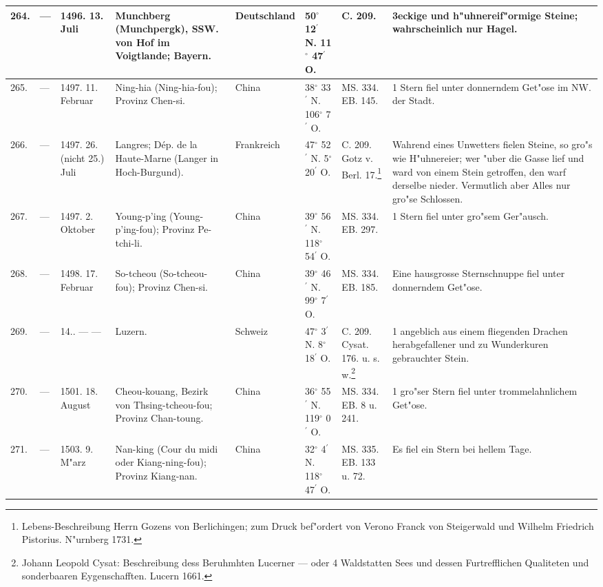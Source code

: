 \documentclass[a4paper, 8pt, oneside, polutonikogreek, german]{article}
\begin{document}
\begin{center}
\begin{longtable}{| p{4mm} | p{2mm} | p{15mm} | p{25mm} | p{16mm} | p{12mm} | p{13mm} | p{20mm} |}
        264. & --- & 1496. 13. Juli & Munchberg (Munchpergk), SSW. von Hof im Voigtlande; Bayern. & Deutschland & 50$^\circ$ 12$^\prime$ N. 11$^\circ$ 47$^\prime$ O. & C. 209. & 3eckige und h"uhnereif"ormige Steine; wahrscheinlich nur Hagel. \\ \hline
        265. & --- & 1497. 11. Februar & Ning-hia (Ning-hia-fou); Provinz Chen-si. & China & 38$^\circ$ 33$^\prime$ N. 106$^\circ$ 7$^\prime$ O. & MS. 334. EB. 145. & 1 Stern fiel unter donnerndem Get"ose im NW. der Stadt. \\ \hline
        266. & --- & 1497. 26. (nicht 25.) Juli & Langres; Dép. de la Haute-Marne (Langer in Hoch-Burgund). & Frankreich & 47$^\circ$ 52$^\prime$ N. 5$^\circ$ 20$^\prime$ O. & C. 209. Gotz v. Berl. 17.\footnote{Lebens-Beschreibung Herrn Gozens von Berlichingen; zum Druck bef"ordert von Verono Franck von Steigerwald und Wilhelm Friedrich Pistorius. N"urnberg 1731.} & Wahrend eines Unwetters fielen Steine, so gro"s wie H"uhnereier; wer "uber die Gasse lief und ward von einem Stein getroffen, den warf derselbe nieder. Vermutlich aber Alles nur gro"se Schlossen. \\ \hline
        267. & --- & 1497. 2. Oktober & Young-p’ing (Young-p’ing-fou); Provinz Pe-tchi-li. & China & 39$^\circ$ 56$^\prime$ N. 118$^\circ$ 54$^\prime$ O. & MS. 334. EB. 297. & 1 Stern fiel unter gro"sem Ger"ausch. \\ \hline
        268. & --- & 1498. 17. Februar & So-tcheou (So-tcheou-fou); Provinz Chen-si. & China & 39$^\circ$ 46$^\prime$ N. 99$^\circ$ 7$^\prime$ O. & MS. 334. EB. 185. & Eine hausgrosse Sternschnuppe fiel unter donnerndem Get"ose. \\ \hline
        269. & --- & 14.. --- --- & Luzern. & Schweiz & 47$^\circ$ 3$^\prime$ N. 8$^\circ$ 18$^\prime$ O. & C. 209. Cysat. 176. u. s. w.\footnote{Johann Leopold Cysat: Beschreibung dess Beruhmhten Lucerner --- oder 4 Waldstatten Sees und dessen Furtrefflichen Qualiteten und sonderbaaren Eygenschafften. Lucern 1661.
} & 1 angeblich aus einem fliegenden Drachen herabgefallener und zu Wunderkuren gebrauchter Stein. \\ \hline
        270. & --- & 1501. 18. August & Cheou-kouang, Bezirk von Thsing-tcheou-fou; Provinz Chan-toung. & China & 36$^\circ$ 55$^\prime$ N. 119$^\circ$ 0$^\prime$ O. & MS. 334. EB. 8 u. 241. & 1 gro"ser Stern fiel unter trommelahnlichem Get"ose. \\ \hline
        271. & --- & 1503. 9. M"arz & Nan-king (Cour du midi oder Kiang-ning-fou); Provinz Kiang-nan. & China & 32$^\circ$ 4$^\prime$ N. 118$^\circ$ 47$^\prime$ O. & MS. 335. EB. 133 u. 72. & Es fiel ein Stern bei hellem Tage. \\ \hline

\end{longtable}
\end{center}
\end{document}
